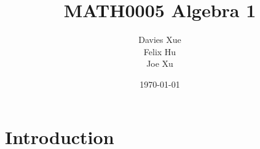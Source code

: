 \documentclass{article}
\title{MATH0005 Algebra 1}
\author{
    {Davies Xue} \\
    {Felix Hu} \\
    {Joe Xu}
}
\date{\today}
\begin{document}
\maketitle

\section{Introduction}
\end{document}
